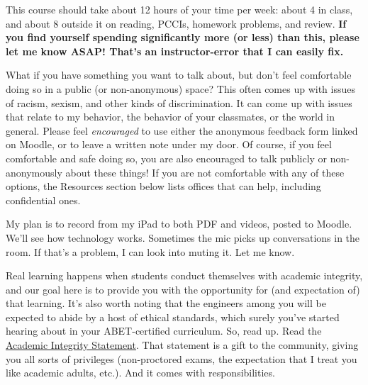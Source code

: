 \documentclass{tufte-handout}
\let\syllabushref\href
\renewcommand{\href}[2]{\syllabushref{#1}{\uline{#2}}}%
\begin{document}
 This course should take about 12 hours of your
time per week: about 4 in class, and about 8 outside it on reading,
PCCIs, homework problems, and review. \textbf{If you find yourself
spending significantly more (or less) than this, please let me know
ASAP! That's an instructor-error that I can easily fix.}

 What if you have something you want to
talk about, but don't feel comfortable doing so in a public (or
non-anonymous) space? This often comes up with issues of racism,
sexism, and other kinds of discrimination. It can come up with issues
that relate to my behavior, the behavior of your classmates, or the
world in general. Please feel \textit{encouraged} to use either the
anonymous feedback form linked on Moodle, or to leave a written note
under my door. Of course, if you feel comfortable and safe doing so, you
are also encouraged to talk publicly or non-anonymously about these
things! If you are not comfortable with any of these options, the
Resources section below lists offices that can help, including
confidential ones.

 My plan is to record from my iPad to both PDF
and videos, posted to Moodle. We'll see how technology works. Sometimes the mic picks up
conversations in the room. If that's a problem, I can look into muting it. Let
me know.

 Real learning happens when students conduct
themselves with academic integrity, and our goal here is to provide you with the
opportunity for (and expectation of) that learning. It's also worth noting that
the engineers among you will be expected to abide by a host of ethical
standards, which surely you've started hearing about in your ABET-certified
curriculum. So, read up. Read the
\href{https://www.smith.edu/your-campus/offices-services/office-student-affairs/student-handbook/academic-honor-code-0}{Academic
  Integrity Statement}. That statement is a gift to the community, giving you
all sorts of privileges (non-proctored exams, the expectation that I treat you
like academic adults, etc.). And it comes with responsibilities. 
\end{document}
